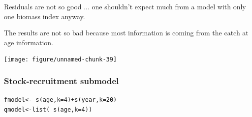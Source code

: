 \documentclass[a4paper,english,10pt]{article}\usepackage[]{graphicx}\usepackage[]{color}
\makeatletter
\newcommand{\hlnum}[1]{\textcolor[rgb]{0.2,0.2,0.2}{#1}}%
\newcommand{\hlopt}[1]{\textcolor[rgb]{0.2,0.2,0.2}{#1}}%
\newcommand{\hlstd}[1]{\textcolor[rgb]{0,0,0}{#1}}%
\newcommand{\hlkwb}[1]{\textcolor[rgb]{0.361,0.506,0.596}{#1}}%
\newcommand{\hlkwc}[1]{\textcolor[rgb]{0.361,0.506,0.596}{#1}}%
\newcommand{\hlkwd}[1]{\textcolor[rgb]{0.361,0.506,0.596}{#1}}%
\newenvironment{kframe}{%
 \def\at@end@of@kframe{}%
 \ifinner\ifhmode%
  \def\at@end@of@kframe{\end{minipage}}%
  \begin{minipage}{\columnwidth}%
 \fi\fi%
 \def\FrameCommand##1{\hskip\@totalleftmargin \hskip-\fboxsep
 \colorbox{shadecolor}{##1}\hskip-\fboxsep
     \hskip-\linewidth \hskip-\@totalleftmargin \hskip\columnwidth}%
 \MakeFramed {\advance\hsize-\width
   \@totalleftmargin\z@ \linewidth\hsize
   \@setminipage}}%
 {\par\unskip\endMakeFramed%
 \at@end@of@kframe}
\newenvironment{knitrout}{}{} %
\makeatother
\begin{document}
Residuals are not so good ... one shouldn't expect much from a model with only one biomass index anyway. 


The results are not so bad because most information is coming from the catch at age information.

\begin{knitrout}
\color{fgcolor}

{\centering \texttt{[image: figure/unnamed-chunk-39]} 

}



\end{knitrout}


\subsubsection{Stock-recruitment submodel}

\begin{knitrout}
\color{fgcolor}\begin{kframe}
\begin{alltt}
\hlstd{fmodel} \hlkwb{<-} \hlopt{~}\hlkwd{s}\hlstd{(age,} \hlkwc{k} \hlstd{=} \hlnum{4}\hlstd{)} \hlopt{+} \hlkwd{s}\hlstd{(year,} \hlkwc{k} \hlstd{=} \hlnum{20}\hlstd{)}
\hlstd{qmodel} \hlkwb{<-} \hlkwd{list}\hlstd{(}\hlopt{~}\hlkwd{s}\hlstd{(age,} \hlkwc{k} \hlstd{=} \hlnum{4}\hlstd{))}
\end{alltt}
\end{kframe}
\end{knitrout}
\end{document}
